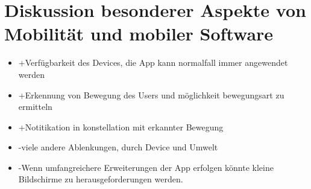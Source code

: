 \documentclass{article}
\begin{document}
    
\section{Diskussion besonderer Aspekte von Mobilität und
mobiler Software}
\begin{itemize}
\item +Verfügbarkeit des Devices, die App kann normalfall immer angewendet werden
\item +Erkennung von Bewegung des Users und möglichkeit bewegungsart zu ermitteln
\item +Notitikation in konstellation mit erkannter Bewegung
\item -viele andere Ablenkungen, durch Device und Umwelt
\item -Wenn umfangreichere Erweiterungen der App erfolgen könnte kleine Bildschirme zu herausgeforderungen werden.
\end{itemize}
    
   
\end{document}
